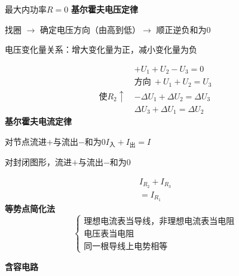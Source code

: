 最大内功率\quad $R=0$
\textbf{基尔霍夫电压定律}

找圈 $\to$ 确定电压方向（由高到低）$\to$ 顺正逆负和为0

电压变化量关系：\unclear{$\pm$}增大变化量为正，减小变化量为负

\begin{align*}
&+U_1+U_2-U_3=0\\
&\text{方向}\ +U_1+U_2=U_3\\
\text{使}R_2\uparrow\ &-\Delta U_1+\Delta U_2=\Delta U_3\\
&\Delta U_3+\Delta U_1=\Delta U_2
\end{align*}
\textbf{基尔霍夫电流定律}

对节点流进$+$与流出$-$和为0\qquad $I_{\text{入}}+I_{\text{出}}=I$%

对封闭图形，流进$+$与流出$-$和为0

\[
\begin{aligned}
I_{R_2}+I_{R_3}\\
=I_{R_1}
\end{aligned}
\]
\textbf{等势点简化法}
\[
\left\{\begin{array}{l}
\text{理想电流表当导线，非理想电流表当电阻}\\
\text{电压表当电阻}\\
\text{同一根导线上电势相等}
\end{array}\right.
\]



\textbf{含容电路}

